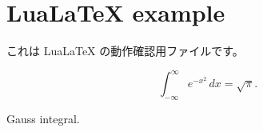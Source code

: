 \documentclass{ltjsarticle}
\begin{document}
\section*{LuaLaTeX example}

これは LuaLaTeX の動作確認用ファイルです。

\[
  \int_{-\infty}^{\infty} e^{-x^2}\,dx = \sqrt{\pi}.
\]

Gauss integral.
\end{document}
